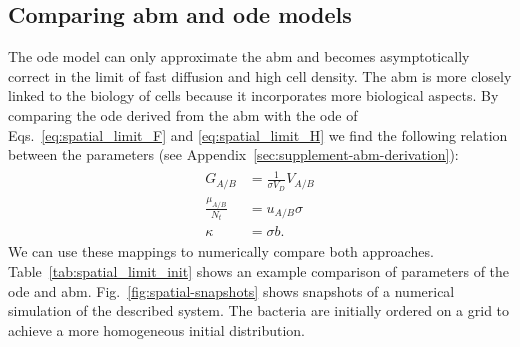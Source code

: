 \documentclass[10pt,1p,authoryear]{elsarticle}
\numberwithin{equation}{section}
\begin{document}
\subsection{Comparing \acs{abm} and \acs{ode} models}
\label{subsec:comparison-abm-and-ode}
The \ac{ode} model can only approximate the \ac{abm} and becomes asymptotically correct in the limit of fast diffusion and high cell density. The \ac{abm} is more closely linked to the biology of cells because it incorporates more biological aspects.
By comparing the \ac{ode} derived from the \ac{abm} with the \ac{ode} of Eqs.~\eqref{eq:spatial_limit_F} and \eqref{eq:spatial_limit_H} we find the following relation between the parameters (see Appendix~\ref{sec:supplement-abm-derivation}):
\begin{align}
    \begin{split}
        G_{A/B} &= \frac{1}{\sigma V_D}V_{A/B}\\
        \frac{\mu_{A/B}}{N_t} &= u_{A/B}\sigma\\
        \kappa &= \sigma b. 
    \end{split}
    \label{eq:ode-abm-mappings}
\end{align}
We can use these mappings to numerically compare both approaches. Table~\ref{tab:spatial_limit_init} shows an example comparison of parameters of the \ac{ode} and \ac{abm}. Fig.~\ref{fig:spatial-snapshots} shows snapshots of a numerical simulation of the described system. The bacteria are initially ordered on a grid to achieve a more homogeneous initial distribution.
%
\end{document}
